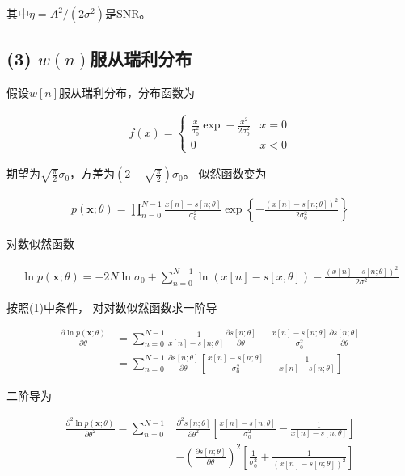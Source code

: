 \documentclass[fontset=windows]{article}
\numberwithin{figure}{section}
\begin{document}
其中\(\eta=A^2/(2\sigma^2)\)是SNR。
\subsection*{(3) \(w(n)\)服从瑞利分布}
假设\(w[n]\)服从瑞利分布，分布函数为

\begin{align*}
	f(x)=\left\{
	\begin{matrix}
		\frac{x}{\sigma_0^2} \exp -\frac{x^2}{2\sigma_0 ^2} & x = 0 \\
		0                                                   & x<0
	\end{matrix}
	\right.
\end{align*}

期望为\(\sqrt{\frac{\pi}{2}}\sigma_0\)，方差为\((2-\sqrt{\frac{\pi}{2}})\sigma_0\)。
似然函数变为

\begin{align*}
	p(\mathbf{x};\theta)=\prod_{n=0}^{N-1}\frac{x[n]-s[n;\theta]}{\sigma_0^2}
	\exp \left\{ -\frac{(x[n]-s[n;\theta])^2}{2\sigma_0^2}\right\}
\end{align*}

对数似然函数

\begin{align*}
	\ln p(\mathbf{x};\theta)=-2N\ln \sigma_0+\sum_{n=0}^{N-1}\ln (x[n]-s[x,\theta])
	-\frac{(x[n]-s[n;\theta])^2}{2\sigma^2}
\end{align*}

按照(1)中条件，
对对数似然函数求一阶导

\begin{align*}
	\frac{\partial \ln p(\mathbf{x};\theta)}{\partial \theta}
	 & =\sum_{n=0}^{N-1}\frac{-1}{x[n]-s[n;\theta]}\frac{\partial s[n;\theta]}{\partial \theta}
	+\frac{x[n]-s[n;\theta]}{\sigma_0^2}\frac{\partial s[n;\theta]}{\partial \theta}            \\
	 & =\sum_{n=0}^{N-1}\frac{\partial s[n;\theta]}{\partial \theta}
	\left[\frac{x[n]-s[n;\theta]}{\sigma_0^2}-\frac{1}{x[n]-s[n;\theta]}\right]
\end{align*}

二阶导为

\begin{align*}
	\frac{\partial^2 \ln p(\mathbf{x};\theta)}{\partial \theta^2}=
	\sum_{n=0}^{N-1} & \frac{\partial^2 s[n;\theta]}{\partial \theta^2}
	\left[\frac{x[n]-s[n;\theta]}{\sigma_0^2}-\frac{1}{x[n]-s[n;\theta]}\right]     \\
	                 & -\left(\frac{\partial s[n;\theta]}{\partial \theta}\right)^2
	\left[\frac{1}{\sigma_0^2}+\frac{1}{(x[n]-s[n;\theta])^2}\right]
\end{align*}
\end{document}
